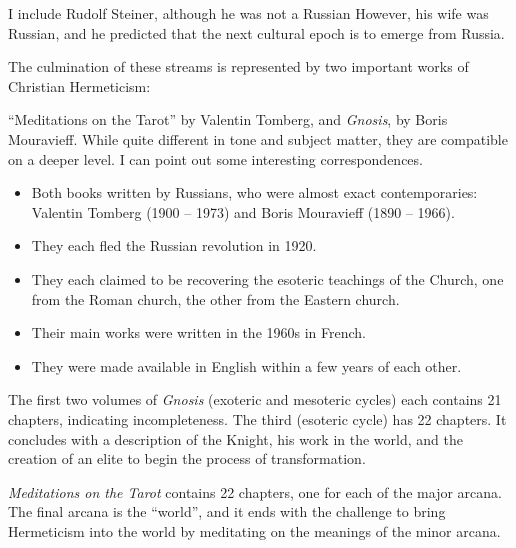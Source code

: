 I include Rudolf Steiner, although he was not a Russian However, his wife was Russian, and he predicted that the next cultural epoch is to emerge from Russia.

The culmination of these streams is represented by two important works of Christian Hermeticism:

``Meditations on the Tarot'' by Valentin Tomberg, and \emph{Gnosis}, by Boris Mouravieff. While quite different in tone and subject matter, they are compatible on a deeper level. I can point out some interesting correspondences.

\begin{itemize}


\item Both books written by Russians, who were almost exact contemporaries: Valentin Tomberg (1900 -- 1973) and Boris Mouravieff (1890 -- 1966).

\item They each fled the Russian revolution in 1920.

\item They each claimed to be recovering the esoteric teachings of the Church, one from the Roman church, the other from the Eastern church.

\item Their main works were written in the 1960s in French.

\item They were made available in English within a few years of each other.
\end{itemize}


The first two volumes of \emph{Gnosis} (exoteric and mesoteric cycles) each contains 21 chapters, indicating incompleteness. The third (esoteric cycle) has 22 chapters. It concludes with a description of the Knight, his work in the world, and the creation of an elite to begin the process of transformation.

\emph{Meditations on the Tarot} contains 22 chapters, one for each of the major arcana. The final arcana is the ``world'', and it ends with the challenge to bring Hermeticism into the world by meditating on the meanings of the minor arcana.



